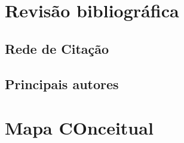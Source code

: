 

\section{Revisão bibliográfica}
\subsection{Rede de Citação}
\subsection{Principais autores}


\section{Mapa COnceitual}
\lipsum[1]







